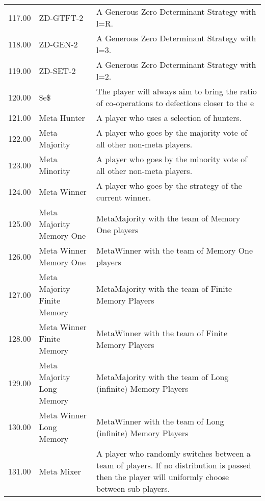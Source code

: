 \begin{table}[!hbtp]
\begin{adjustbox}{width=2\textwidth, angle=90}
\begin{tabular}{rll}
	117.00 & ZD-GTFT-2                   & A Generous Zero Determinant Strategy with l=R.                                                                                    \\
	118.00 & ZD-GEN-2                    & A Generous Zero Determinant Strategy with l=3.                                                                                    \\
	119.00 & ZD-SET-2                    & A Generous Zero Determinant Strategy with l=2.                                                                                    \\
	120.00 & \$e\$                       & The player will always aim to bring the ratio of co-operations to defections closer to the e                                      \\
	121.00 & Meta Hunter                 & A player who uses a selection of hunters.                                                                                         \\
	122.00 & Meta Majority               & A player who goes by the majority vote of all other non-meta players.                                                             \\
	123.00 & Meta Minority               & A player who goes by the minority vote of all other non-meta players.                                                             \\
	124.00 & Meta Winner                 & A player who goes by the strategy of the current winner.                                                                          \\
	125.00 & Meta Majority Memory One    & MetaMajority with the team of Memory One players                                                                                  \\
	126.00 & Meta Winner Memory One      & MetaWinner with the team of Memory One players                                                                                    \\
	127.00 & Meta Majority Finite Memory & MetaMajority with the team of Finite Memory Players                                                                               \\
	128.00 & Meta Winner Finite Memory   & MetaWinner with the team of Finite Memory Players                                                                                 \\
	129.00 & Meta Majority Long Memory   & MetaMajority with the team of Long (infinite) Memory Players                                                                      \\
	130.00 & Meta Winner Long Memory     & MetaWinner with the team of Long (infinite) Memory Players                                                                        \\
	131.00 & Meta Mixer                  & A player who randomly switches between a team of players.
	If no distribution is passed then the player will uniformly choose between
	sub players.


\end{tabular}
\end{adjustbox}
\end{table}
